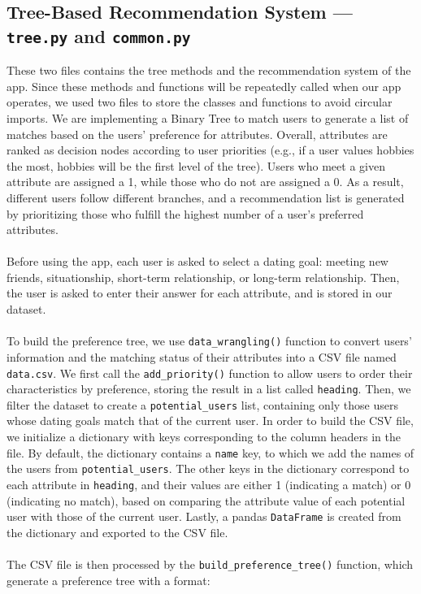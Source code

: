 \documentclass[fontsize=11pt]{article}
\begin{document}
\subsection*{Tree-Based Recommendation System --- \texttt{tree.py} and \texttt{common.py}}
These two files contains the tree methods and the recommendation system of the app.
Since these methods and functions will be repeatedly called when our app operates, we used two files to store the classes and functions to avoid circular imports.
We are implementing a Binary Tree to match users to generate a list of matches based on the users’ preference for attributes.
Overall, attributes are ranked as decision nodes according to user priorities (e.g., if a user values hobbies the most, hobbies will be the first level of the tree).
Users who meet a given attribute are assigned a 1, while those who do not are assigned a 0. As a result, different users follow different branches, and a recommendation list is generated by prioritizing those who fulfill the highest number of a user's preferred attributes.
\\
\\
Before using the app, each user is asked to select a dating goal: meeting new friends, situationship, short-term relationship, or long-term relationship.
Then, the user is asked to enter their answer for each attribute, and is stored in our dataset.
\\
\\
To build the preference tree, we use \texttt{data\_wrangling()} function to convert users' information and the matching status
of their attributes into a CSV file named \texttt{data.csv}. We first call the \texttt{add\_priority()} function to allow users to order their characteristics
by preference, storing the result in a list called \texttt{heading}. Then, we filter the dataset to create a \texttt{potential\_users} list, containing only
those users whose dating goals match that of the current user. In order to build the CSV file, we initialize a dictionary with keys corresponding to the column
headers in the file. By default, the dictionary contains a \texttt{name} key, to which we add the names of the users from \texttt{potential\_users}. The other keys in
the dictionary correspond to each attribute in \texttt{heading}, and their values are either 1 (indicating a match) or 0 (indicating no match), based on comparing the
attribute value of each potential user with those of the current user. Lastly, a pandas \texttt{DataFrame} is created from the dictionary and exported to the CSV file.
\\
\\
The CSV file is then processed by the \texttt{build\_preference\_tree()} function, which generate a preference tree with a format:
\end{document}
